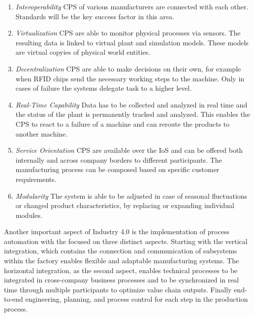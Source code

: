 \begin{enumerate}
  \item \textit{Interoperability} \ac{CPS} of various manufacturers are connected with each other. Standards will be the key success factor in this area.\cite[cf.][p. 11]{Her2015}
  \item \textit{Virtualization} \ac{CPS} are able to monitor physical processes via sensors. The resulting data is linked to virtual plant and simulation models. These models are virtual copyies of physical world entities.\cite[cf.][p. 11]{Her2015}
  \item \textit{Decentralization} \ac{CPS} are able to make decisions on their own, for example when \ac{RFID} chips send the necessary working steps to the machine. Only in cases of failure the systems delegate task to a higher level.\cite[cf.][p. 11]{Her2015}
  \item \textit{Real-Time Capability} Data has to be collected and analyzed in real time and the status of the plant is permanently tracked and analyzed. This enables the \ac{CPS} to react to a failure of a machine and can reroute the products to another machine.\cite[cf.][p. 11]{Her2015}
  \item \textit{Service Orientation} \ac{CPS} are available over the \ac{IoS} and can be offered both internally and across company borders to different participants. The manufacturing process can be composed based on specific customer requirements.\cite[cf.][p. 11]{Her2015}
  \item \textit{Modularity} The system is able to be adjusted in case of seasonal fluctuations or changed product characteristics, by replacing or expanding individual modules.\cite[cf.][p. 11]{Her2015}
\end{enumerate}

Another important aspect of Industry 4.0 is the implementation of process automation with the focused on three distinct aspects.
Starting with the vertical integration, which contains the connection and communication of subsystems within the factory enables flexible and adaptable manufacturing systems.\cite[cf.][p. 7 ff.]{Vbw2014}
The horizontal integration, as the second aspect, enables technical processes to be integrated in cross-company business processes and to be synchronized in real time through multiple participants to optimize value chain outputs.\cite[cf.][p. 7 ff.]{Vbw2014}
Finally end-to-end engineering, planning, and process control for each step in the production process.\cite[cf.]{Lyd2016}

